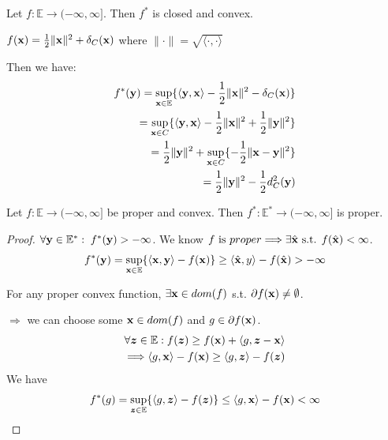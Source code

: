 \documentclass[11pt]{article}
\begin{document}
\begin{theorem}
    Let $f: \mathbb{E} \to (-\infty, \infty]$. Then $f^{*}$ is closed and convex.
\end{theorem}

\begin{example}
    $f({\mathbf{x}}) = \frac{1}{2}\| {\mathbf{x}} \| ^{2} + \delta_{C}({\mathbf{x}})$ where $\| \cdot \| = \sqrt{\langle \cdot ,\cdot  \rangle} $

    Then we have:
    \begin{align*}
        f^{*}({\mathbf{y}}) = \sup_{{\mathbf{x}} \in \mathbb{E}}\{ \langle {\mathbf{y}}, {\mathbf{x}} \rangle - \frac{1}{2}\| {\mathbf{x}} \|^{2}  
            - \delta_{C}({\mathbf{x}})\}\\
        = \sup_{{\mathbf{x}} \in C}\{ \langle {\mathbf{y}}, {\mathbf{x}} \rangle - \frac{1}{2}\| {\mathbf{x}} \|^{2} + \frac{1}{2}\| {\mathbf{y}} \| ^{2} \}\\
        = \frac{1}{2}\| {\mathbf{y}} \| ^{2} + \sup_{{\mathbf{x}} \in C}\{ -\frac{1}{2}\| {\mathbf{x}} - {\mathbf{y}} \|^{2}  \}\\
        = \frac{1}{2}\| {\mathbf{y}} \| ^{2} - \frac{1}{2}d_{C}^{2}({\mathbf{y}})
    \end{align*}
\end{example}

\begin{theorem}
    Let $f: \mathbb{E} \to (-\infty,\infty] $ be proper and convex. Then 
    $f^{*}: \mathbb{E}^{*} \to (-\infty,\infty]$ is proper.
\end{theorem}
\begin{proof}
    $\forall {\mathbf{y}} \in \mathbb{E}^{*}: \; f^{*}({\mathbf{y}}) > -\infty$.
    We know $f \text{ is } proper \Longrightarrow \exists \hat{{\mathbf{x}}} \text{ s.t. } f(\hat{{\mathbf{x}}}) < \infty$.
    \begin{align*}
        f^{*}({\mathbf{y}}   ) = \sup_{{\mathbf{x}} \in \mathbb{E}}\{ \langle {\mathbf{x}},{\mathbf{y}} \rangle - f({\mathbf{x}}) \} 
            \ge \langle \hat{{\mathbf{x}}},y \rangle - f(\hat{{\mathbf{x}}}) > -\infty
    \end{align*}
    \begin{lemma}
        For any proper convex function, $\exists {\mathbf{x}} \in dom(f)$ s.t. 
        $\partial f({\mathbf{x}}) \neq \emptyset$.
    \end{lemma}
    $\Longrightarrow$ we can choose some ${\mathbf{x}} \in dom(f)$ and $g \in \partial f({\mathbf{x}})$.
    \begin{align*}
        \forall  {\bm{z}} \in \mathbb{E}: f({\bm{z}}) \ge f({\mathbf{x}}) + \langle g, {\bm{z}} - {\mathbf{x}} \rangle\\
        \Longrightarrow \langle g,{\mathbf{x}} \rangle - f({\mathbf{x}}) \ge \langle g,{\bm{z}} \rangle - f({\bm{z}})
    \end{align*}
    We have 
    \begin{align*}
        f^{*}(g) = \sup_{{\bm{z}} \in \mathbb{E}}\{ \langle g,{\bm{z}} \rangle - f({\bm{z}})\} 
            \le \langle g,{\mathbf{x}} \rangle -f({\mathbf{x}}) < \infty
    \end{align*}
\end{proof}
\end{document}
